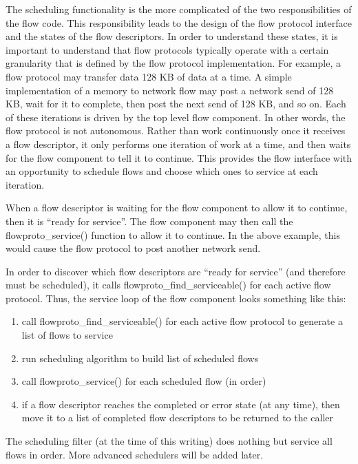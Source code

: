 \documentclass[12pt]{article} %
\begin{document}
The scheduling functionality is the more complicated of the two
responsibilities of the flow code.  This responsibility leads to the 
design of the flow protocol interface and the states of the flow descriptors.
In order to understand these states, it is important to understand that 
flow protocols typically operate with a certain granularity that is 
defined by the flow protocol implementation.  For example, a flow protocol 
may transfer data 128 KB of data at a time.  A simple implementation of a memory to 
network flow may post a network send of 128 KB, wait for it to complete, then
post the next send of 128 KB, and so on.  Each of these iterations is driven by
the top level flow component.  In other words, the flow protocol is not 
autonomous.  Rather than work continuously once it receives a flow descriptor, 
it only performs one iteration of work at a time, and then waits for the 
flow component to tell it to continue.  This provides the flow interface
with an opportunity to schedule flows and choose which ones to service at 
each iteration.

When a flow descriptor is waiting for the flow component to allow it to
continue, then it is ``ready for service''.  The flow component may
then call the flowproto\_service() function to allow it to continue.  In 
the above example, this would cause the flow protocol to post another network
send.  

In order to discover which flow descriptors are ``ready for service'' (and 
therefore must be scheduled), it calls flowproto\_find\_serviceable() for each
active flow protocol.  Thus, the service loop of the flow component looks something like this:

\begin{enumerate}
\item call flowproto\_find\_serviceable() for each active flow protocol to
generate a list of flows to service
\item run scheduling algorithm to build list of scheduled flows
\item call flowproto\_service() for each scheduled flow (in order)
\item if a flow descriptor reaches the completed or error state (at any time),
then move it to a list of completed flow descriptors to be returned to the 
caller
\end{enumerate}

The scheduling filter (at the time of this writing) does nothing but service
all flows in order.  More advanced schedulers will be added later.
\end{document}
